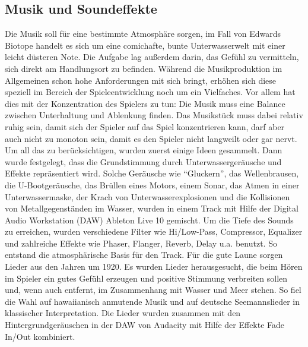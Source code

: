 \subsection{Musik und Soundeffekte}
Die Musik soll für eine bestimmte Atmosphäre sorgen, im Fall von Edwards Biotope handelt es sich um eine comichafte, bunte Unterwasserwelt mit einer leicht düsteren Note. Die Aufgabe lag außerdem darin, das Gefühl zu vermitteln, sich direkt am Handlungsort zu befinden. 
Während die Musikproduktion im Allgemeinen schon hohe Anforderungen mit sich bringt, erhöhen sich diese speziell im Bereich der Spieleentwicklung noch um ein Vielfaches. Vor allem hat dies mit der Konzentration des Spielers zu tun: Die Musik muss eine Balance zwischen Unterhaltung und Ablenkung finden. Das Musikstück muss dabei relativ ruhig sein, damit sich der Spieler auf das Spiel konzentrieren kann, darf aber auch nicht zu monoton sein, damit es den Spieler nicht langweilt oder gar nervt. 
Um all das zu berücksichtigen, wurden zuerst einige Ideen gesammelt. Dann wurde festgelegt, dass die Grundstimmung durch Unterwassergeräusche und Effekte repräsentiert wird. Solche Geräusche wie “Gluckern”, das Wellenbrausen, die U-Bootgeräusche, das Brüllen eines Motors, einem Sonar, das Atmen in einer Unterwassermaske, der Krach von Unterwasserexplosionen und die Kollisionen von Metallgegenständen im Wasser, wurden in einem Track mit Hilfe der Digital Audio Workstation (DAW) Ableton Live 10 gemischt. Um die Tiefe des Sounds zu erreichen, wurden verschiedene Filter wie Hi/Low-Pass, Compressor, Equalizer und zahlreiche Effekte wie Phaser, Flanger, Reverb, Delay u.a. benutzt. So entstand die atmosphärische Basis für den Track. 
Für die gute Laune sorgen Lieder aus den Jahren um 1920. Es wurden Lieder herausgesucht, die beim Hören im Spieler ein gutes Gefühl erzeugen und positive Stimmung verbreiten sollen und, wenn auch entfernt, im Zusammenhang mit Wasser und Meer stehen. So fiel die Wahl auf hawaiianisch anmutende Musik und auf deutsche Seemannslieder in klassischer Interpretation. Die Lieder wurden zusammen mit den Hintergrundgeräuschen in der DAW von Audacity mit Hilfe der Effekte Fade In/Out kombiniert. 
